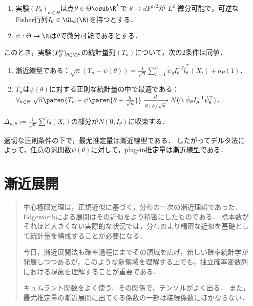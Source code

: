 \documentclass[uplatex,dvipdfmx]{jsreport}
\begin{document}
\begin{lemma}\mbox{}
    \begin{enumerate}[({E}1)]
        \item 実験$(P_\theta)_{\theta\in\Theta}$は点$\theta\in\Theta\osub\R^k$で
        $\theta\mapsto dP^{1/2}$が
        $L^2$-微分可能で，可逆なFisher行列$I_\theta\in\GL_k(\R)$を持つとする．
        \item $\psi:\Theta\to\R$は$\theta$で微分可能であるとする．
    \end{enumerate}
    このとき，実験$(P^n_\theta)_{\theta\in\R^k}$の統計量列$(T_n)$について，次の2条件は同値．
    \begin{enumerate}
        \item 漸近線型である：$\sqrt{n}(T_n-\psi(\theta))=\frac{1}{\sqrt{n}}\sum^n_{i=1}\dot{\psi}_\theta I_\theta^{-1}\dot{l}_\theta^\top(X_i)+o_P(1)$．
        \item $T_n$は$\psi(\theta)$に対する正則な統計量の中で最適である：$\forall_{h\in\Theta}\;\sqrt{n}\paren{T_n-\psi\paren{\theta+\frac{h}{\sqrt{n}}}}\xrightarrow[\theta+h/\sqrt{n}]{d}N(0,\dot{\psi}_{\theta}I^{-1}_\theta\dot{\psi}_{\theta}^\top)$．
    \end{enumerate}
\end{lemma}
\begin{remarks}
    $\Delta_{n,\theta}:=\frac{1}{\sqrt{n}}\sum\dot{l}_\theta(X_i)$の部分が$N(0,I_\theta)$に収束する．
\end{remarks}

\begin{example}
    適切な正則条件の下で，最尤推定量は漸近線型である．
    したがってデルタ法によって，任意の汎関数$\psi(\theta)$に対して，plug-in推定量は漸近線型である．
\end{example}


\chapter{漸近展開}

\begin{quotation}
    中心極限定理は，正規近似に基づく，分布の一次の漸近理論であった．
    Edgeworthによる展開はその近似をより精密にしたものである．
    標本数がそれほど大きくない実際的な状況では，分布のより精密な近似を基礎として統計量を構成することが必要になる．

    今日，漸近展開法も確率過程にまでその領域を広げ，新しい確率統計学が発展しつつあるが，このような新領域を理解する上でも，独立確率変数列における現象を理解することが重要である．

    キュムラント関数をよく使う．その関係で，テンソルがよく出る．
    また，最尤推定量の漸近展開に出てくる係数の一部は接続係数にほかならない．
\end{quotation}
\end{document}
